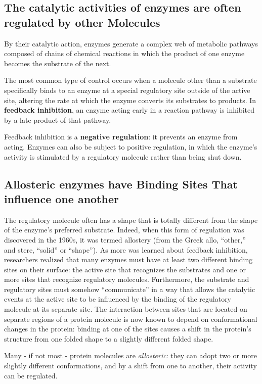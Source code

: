 \subsection{The catalytic activities of enzymes are often regulated by other Molecules}

By their catalytic action, enzymes generate a complex web of metabolic pathways
composed of chains of chemical reactions in which the product of
one enzyme becomes the substrate of the next.

The most common type of control occurs when a molecule other than a
substrate specifically binds to an enzyme at a special regulatory site outside
of the active site, altering the rate at which the enzyme converts its
substrates to products. In \textbf{feedback inhibition}, an enzyme acting early in
a reaction pathway is inhibited by a late product of that pathway.

Feedback inhibition is a \textbf{negative regulation}: it prevents an enzyme from
acting. Enzymes can also be subject to positive regulation, in which the
enzyme’s activity is stimulated by a regulatory molecule rather than being
shut down.

\subsection{Allosteric enzymes have Binding Sites That influence one another}

The regulatory molecule often has a shape that is totally
different from the shape of the enzyme’s preferred substrate. Indeed,
when this form of regulation was discovered in the 1960s, it was termed
allostery (from the Greek allo, “other,” and stere, “solid” or “shape”). As
more was learned about feedback inhibition, researchers realized that
many enzymes must have at least two different binding sites on their
surface: the active site that recognizes the substrates and one or more
sites that recognize regulatory molecules. Furthermore, the substrate and
regulatory sites must somehow “communicate” in a way that allows the
catalytic events at the active site to be influenced by the binding of the
regulatory molecule at its separate site.
The interaction between sites that are located on separate regions of a
protein molecule is now known to depend on conformational changes
in the protein: binding at one of the sites causes a shift in the protein’s
structure from one folded shape to a slightly different folded shape.

Many - if not most - protein molecules are \textit{allosteric}: they can adopt
two or more slightly different conformations, and by a shift from one to
another, their activity can be regulated.


